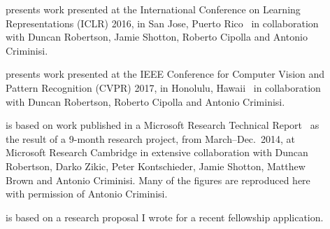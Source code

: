 \begin{acknowledgements}
\begin{description}
	\item[] presents work presented at the International Conference on Learning Representations (ICLR) 2016, in San Jose, Puerto Rico~\citep{Ioannou2016} in collaboration with Duncan Robertson, Jamie Shotton, Roberto Cipolla and Antonio Criminisi.

	\item[] presents work presented at the IEEE Conference for Computer Vision and Pattern Recognition (CVPR) 2017, in Honolulu, Hawaii~\citep{ioannou2016e} in collaboration with Duncan Robertson, Roberto Cipolla and Antonio Criminisi.
	
	\item[] is based on work published in a Microsoft Research Technical Report~\citep{Ioannou2015} as the result of a 9-month research project, from March--Dec.~2014, at Microsoft Research Cambridge in extensive collaboration with Duncan Robertson, Darko Zikic, Peter Kontschieder, Jamie Shotton, Matthew Brown and Antonio Criminisi. Many of the figures are reproduced here with permission of Antonio Criminisi.

	\item[] is based on a research proposal I wrote for a recent fellowship application.
\end{description}


\end{acknowledgements}
